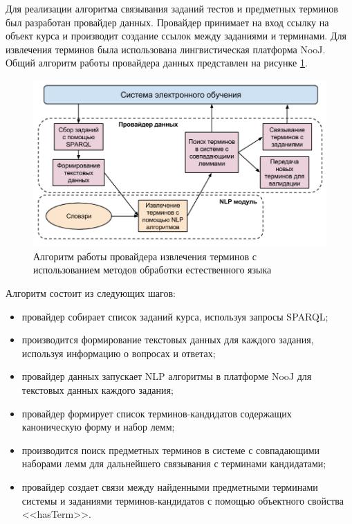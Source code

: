 Для реализации алгоритма связывания заданий тестов и предметных терминов был разработан провайдер данных. Провайдер принимает на вход ссылку на объект курса и производит создание ссылок между заданиями и терминами. Для извлечения терминов была использована лингвистическая платформа NooJ. Общий алгоритм работы провайдера данных представлен на рисунке \ref{fig:NLPAlgo}.

\begin{figure}[ht] 
  \center
  \includegraphics[scale=0.45]{NLPAlgo}
  \caption{Алгоритм работы провайдера извлечения терминов с использованием методов обработки естественного языка} 
  \label{fig:NLPAlgo}
\end{figure}

Алгоритм состоит из следующих шагов:

\begin{itemize}
\item провайдер собирает список заданий курса, используя запросы SPARQL;
\item производится формирование текстовых данных для каждого задания, используя информацию о вопросах и ответах;
\item провайдер данных запускает NLP алгоритмы в платформе NooJ для текстовых данных каждого задания;
\item провайдер формирует список терминов-кандидатов содержащих каноническую форму и набор лемм;
\item производится поиск предметных терминов в системе с совпадающими наборами лемм для дальнейшего связывания с терминами кандидатами;
\item провайдер создает связи между найденными предметными терминами системы и заданиями терминов-кандидатов с помощью объектного свойства <<hasTerm>>.
\end{itemize}



